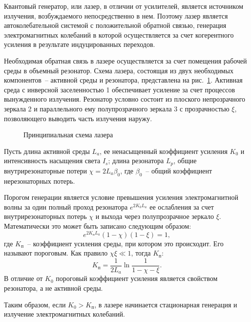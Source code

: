 
Квантовый генератор, или лазер, в отличии от усилителей, является источником
излучения, возбуждаемого непосредственно в нем. Поэтому лазер является
автоколебательной системой с положительной обратной связью, генерация
электромагнитных колебаний в которой осуществляется за счет когерентного
усиления в результате индуцированных переходов.

Необходимая обратная связь в лазере осуществляется за счет помещения рабочей
среды в объемный резонатор. Схема лазера, состоящая из двух необходимых
компонентов~-- активной среды и резонатора, представлена на рис.~\ref{pic12.1}.
Активная среда с инверсной заселенностью 1 обеспечивает усиление за счет
процессов вынужденного излучения. Резонатор условно состоит из плоского
непрозрачного зеркала 2 и параллельного ему полупрозрачного зеркала 3 с
прозрачностью \( \xi \), позволяющего выводить часть излучения наружу.

\begin{figure}[h!]
  \caption{Принципиальная схема лазера}
  \label{pic12.1}
\end{figure}

Пусть длина активной среды \( L_a \), ее ненасыщенный коэффициент усиления
\( K_0 \) и интенсивность насыщения света \( I_s \); длина резонатора \( L_p \),
общие внутрирезонаторные потери \( \chi = 2L_a\beta_0 \), где \( \beta_0 \)~--
общий коэффициент нерезонаторных потерь.

Порогом генерации является условие превышения усиления электромагнитной волны за
один полный проход резонатора \( e^{2K_0 L_a} \) ее ослабления за счет
внутрирезонаторных потерь \( \chi \) и выхода через полупрозрачное зеркало
\( \xi \). Математически это может быть записано следующим образом:
\[
  e^{2K_\text{п} L_a}(1 - \chi)(1 - \xi) = 1,
\]
где \( K_\text{п} \)~-- коэффициент усиления среды, при котором это происходит.
Его называют пороговым. Как правило \( \chi\xi \ll 1 \), тогда \( K_\text{п} \):
\[
  K_\text{п} = \frac{1}{2L_a}\ln\frac{1}{1 - \chi - \xi}.
\]
В отличие от \( K_0 \) пороговый коэффициент усиления является свойством
резонатора, а не активной среды.

Таким образом, если \( K_0 > K_\text{п} \), в лазере начинается стационарная
генерация и излучение электромагнитных колебаний.
